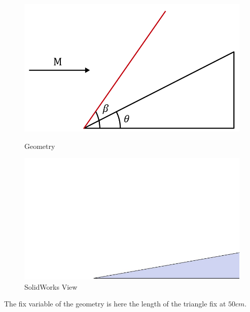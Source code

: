 \begin{figure}[H]
    \centering
    \begin{minipage}[b]{0.45\linewidth}
        \centering
        \includegraphics[width=\linewidth]{ressources/images/Slope.png}
		\caption{Geometry}
    \end{minipage}
    \begin{minipage}[b]{0.45\linewidth}
        \centering
        \includegraphics[width=\linewidth]{ressources/images/SlopeSW.jpg}
		\caption{SolidWorks View}
    \end{minipage}
    \label{fig:slope}
\end{figure}

The fix variable of the geometry is here the length of the triangle fix at $50cm$.

